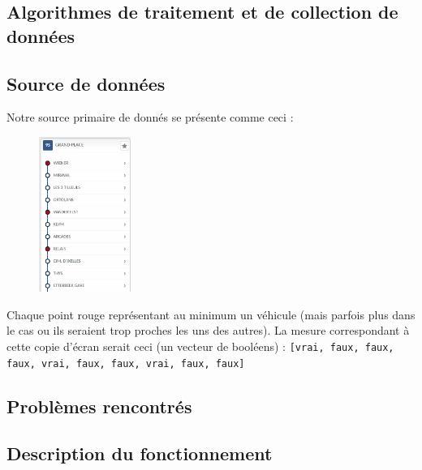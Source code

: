 \documentclass[letterpaper]{article}
\begin{document}
\newpage
\begin{appendices}
\section{Algorithmes de traitement et de collection de données}
\subsection{Source de données}
\label{align}
Notre source primaire de donnés se présente comme ceci :

\begin{figure}[h]
   \centerline{\includegraphics[width=3cm]{mstib.png}}
\end{figure}

Chaque point rouge représentant au minimum un véhicule (mais parfois plus dans le cas ou ils seraient trop proches les uns des autres). La mesure correspondant à cette copie d'écran serait ceci (un vecteur de booléens) : \texttt{[vrai, faux, faux, faux, vrai, faux, faux, vrai, faux, faux]}

\subsection{Problèmes rencontrés}

\subsection{Description du fonctionnement}


\end{appendices}
\end{document}
